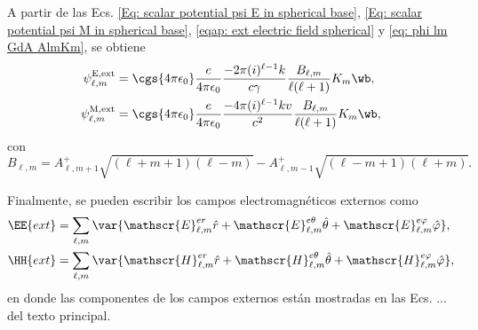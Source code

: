 A partir de las Ecs. \eqref{Eq: scalar potential psi E in spherical base}, \eqref{Eq: scalar potential psi M in spherical base}, \eqref{eqap: ext electric field spherical} y \eqref{eq: phi lm GdA AlmKm}, se obtiene 
\begin{align}
\psi_{\ell, m}^{\rm E, ext} &= \cgs{4\pi\epsilon_0}\frac{e}{4\pi\epsilon_0}\frac{-2\pi(i)^{\ell-1}k}{c \gamma}\frac{B_{\ell,m}}{\ell(\ell+1)}K_m\wb, \\
\psi_{\ell, m}^{\rm M, ext} &= \cgs{4\pi\epsilon_0}\frac{e}{4\pi\epsilon_0}\frac{-4\pi(i)^{\ell-1}k v}{c^2}\frac{B_{\ell,m}}{\ell(\ell+1)}K_m\wb,
\end{align}
con
\begin{equation}
B_{\ell, m} = A_{\ell,m+1}^{+}\sqrt{(\ell + m+1)(\ell-m)}-A_{\ell,m-1}^{+}\sqrt{(\ell - m+1)(\ell+m)}.
\end{equation}

Finalmente, se pueden escribir los campos electromagnéticos externos como 
\begin{align}
\EE{ext} &= \sum_{\ell,m}\var{\mathscr{E}_{\ell, m}^{er}\hat{r} + \mathscr{E}_{\ell, m}^{e\theta}\hat{\theta}+\mathscr{E}_{\ell, m}^{e\varphi}\hat{\varphi}},\\
\HH{ext} &= \sum_{\ell,m}\var{\mathscr{H}_{\ell, m}^{er}\hat{r} + \mathscr{H}_{\ell, m}^{e\theta}\hat{\theta}+\mathscr{H}_{\ell, m}^{e\varphi}\hat{\varphi}},
\end{align}
en donde las componentes de los campos externos están mostradas en las Ecs. ... del texto principal.
